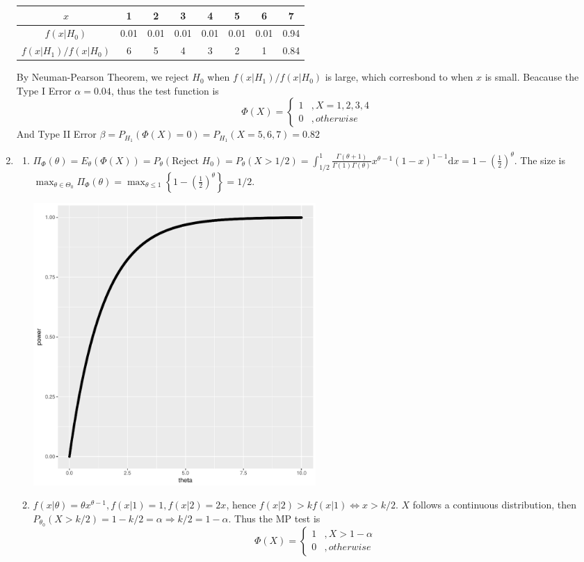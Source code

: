 \documentclass{article}
\begin{document}
\begin{enumerate}[leftmargin = 0 em, label = \arabic*., font = \bfseries]
	\begin{tabular}{cccccccc}
	\toprule
		$x$ & 1 & 2 & 3 & 4 & 5 & 6 & 7\\
		\midrule
		$f(x|H_0)$ & 0.01 & 0.01 & 0.01 & 0.01 &  0.01 &0.01 & 0.94\\
		$f(x|H_1)/f(x|H_0)$ & 6 & 5 & 4 & 3 & 2 & 1 & 0.84\\
		\bottomrule
	\end{tabular}

	By Neuman-Pearson Theorem, we reject $H_0$ when $f(x|H_1)/f(x|H_0)$ is large, which corresbond to when $x$ is small. Beacause the Type I Error $\alpha = 0.04$, thus the test function is
	\[\Phi(X) = \begin{cases}
		1 & , X = 1, 2, 3, 4 \\
		0 & , otherwise
	\end{cases}\]
	And Type II Error $\beta = P_{H_1}(\Phi(X) = 0) = P_{H_1}(X = 5,6,7) = 0.82$
	\newpage
	\item 
	\begin{enumerate}
		\item 
		$\Pi_{\Phi}(\theta) = E_{\theta}(\Phi(X)) = P_{\theta}(\textrm{Reject $H_0$}) = P_{\theta} (X > 1/2) =  \int_{1/2}^1 \frac{\Gamma(\theta + 1)}{\Gamma(1) \Gamma(\theta)} x^{\theta - 1} (1 - x)^{1-1} \mathrm{d}x =1 - \left( \frac{1}{2}\right)^\theta $. The size is $\max_{\theta \in \Theta_0} \Pi_{\Phi}(\theta) = \max_{\theta \leq 1} \left\{1 - \left( \frac{1}{2}\right)^\theta\right\} = 1/2$.

		\begin{center}
		\includegraphics[width = 0.5\textwidth]{p1.pdf}
		
		\end{center}

		\item 
		$f(x | \theta) = \theta x^{\theta - 1} , f(x | 1) = 1, f(x|2) = 2x$, hence $f(x|2) > kf(x|1) \iff x > k/2$. $X$ follows a continuous distribution, then $P_{\theta_0}(X > k/2) = 1 - k/2 = \alpha \Rightarrow k /2 = 1 - \alpha$. Thus the MP test is
		\[\Phi(X) = \begin{cases}
			1 & , X > 1 - \alpha \\
			0 & , otherwise
		\end{cases}\]


\end{enumerate}
\end{enumerate}
\end{document}
